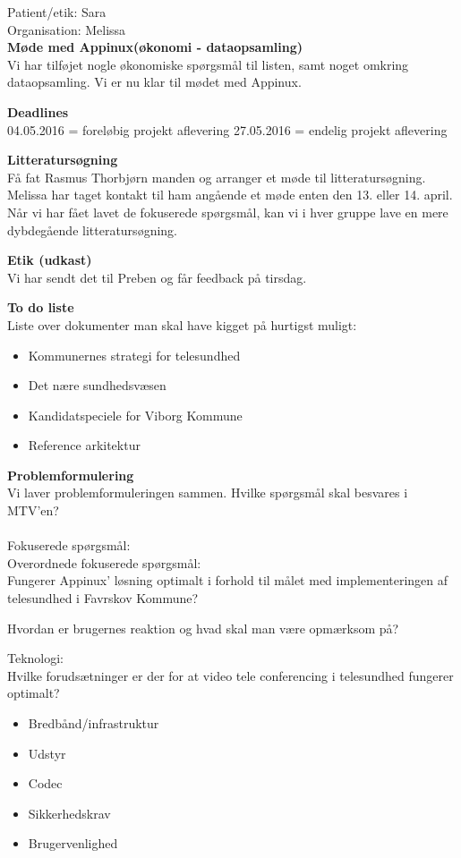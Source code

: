 Patient/etik:
Sara\\

Organisation:
Melissa\\


\textbf{Møde med Appinux(økonomi - dataopsamling)}
\\
Vi har tilføjet nogle økonomiske spørgsmål til listen, samt noget omkring dataopsamling. Vi er nu klar til mødet med Appinux. 

\textbf{Deadlines}
\\
04.05.2016 = foreløbig projekt aflevering
27.05.2016 = endelig projekt aflevering

\textbf{Litteratursøgning}
\\
Få fat Rasmus Thorbjørn manden og arranger et møde til litteratursøgning.
Melissa har taget kontakt til ham angående et møde enten den 13. eller 14. april.\\
Når vi har fået lavet de fokuserede spørgsmål, kan vi i hver gruppe lave en mere dybdegående litteratursøgning. 

\textbf{Etik (udkast)}
\\
Vi har sendt det til Preben og får feedback på tirsdag. 

\textbf{To do liste}
\\
Liste over dokumenter man skal have kigget på hurtigst muligt:
\begin{itemize}
	\item Kommunernes strategi for telesundhed
	\item Det nære sundhedsvæsen
	\item Kandidatspeciele for Viborg Kommune
	\item Reference arkitektur
\end{itemize}

\textbf{Problemformulering}
\\
Vi laver problemformuleringen sammen. Hvilke spørgsmål skal besvares i MTV'en?\\ \\

Fokuserede spørgsmål: \\

Overordnede fokuserede spørgsmål: \\
Fungerer Appinux' løsning optimalt i forhold til målet med implementeringen af telesundhed i Favrskov Kommune?

Hvordan er brugernes reaktion og hvad skal man være opmærksom på?

Teknologi: \\
Hvilke forudsætninger er der for at video tele conferencing i telesundhed fungerer optimalt?\\
\begin{itemize}
	\item Bredbånd/infrastruktur
	\item Udstyr
	\item Codec
	\item Sikkerhedskrav
	\item Brugervenlighed
\end{itemize}

